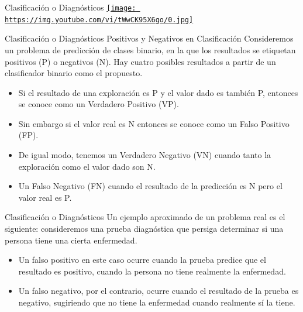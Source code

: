 \documentclass[
  ignorenonframetext,
]{beamer}
\providecommand{\tightlist}{%
  \setlength{\itemsep}{0pt}\setlength{\parskip}{0pt}}
\begin{document}
\begin{frame}{Clasificación o Diagnósticos}
\protect\hypertarget{clasificaciuxf3n-o-diagnuxf3sticos-3}{}
\href{https://www.youtube.com/watch?v=tWwCK95X6go}{\texttt{[image: https://img.youtube.com/vi/tWwCK95X6go/0.jpg]}}
\end{frame}

\begin{frame}{Clasificación o Diagnósticos}
\protect\hypertarget{clasificaciuxf3n-o-diagnuxf3sticos-4}{}
Positivos y Negativos en Clasificación Consideremos un problema de
predicción de clases binario, en la que los resultados se etiquetan
positivos (P) o negativos (N). Hay cuatro posibles resultados a partir
de un clasificador binario como el propuesto.

\begin{itemize}
\tightlist
\item
  Si el resultado de una exploración es P y el valor dado es también P,
  entonces se conoce como un Verdadero Positivo (VP).
\item
  Sin embargo si el valor real es N entonces se conoce como un Falso
  Positivo (FP).
\item
  De igual modo, tenemos un Verdadero Negativo (VN) cuando tanto la
  exploración como el valor dado son N.
\item
  Un Falso Negativo (FN) cuando el resultado de la predicción es N pero
  el valor real es P.
\end{itemize}
\end{frame}

\begin{frame}{Clasificación o Diagnósticos}
\protect\hypertarget{clasificaciuxf3n-o-diagnuxf3sticos-5}{}
Un ejemplo aproximado de un problema real es el siguiente: consideremos
una prueba diagnóstica que persiga determinar si una persona tiene una
cierta enfermedad.

\begin{itemize}
\tightlist
\item
  Un falso positivo en este caso ocurre cuando la prueba predice que el
  resultado es positivo, cuando la persona no tiene realmente la
  enfermedad.
\item
  Un falso negativo, por el contrario, ocurre cuando el resultado de la
  prueba es negativo, sugiriendo que no tiene la enfermedad cuando
  realmente sí la tiene.
\end{itemize}
\end{frame}
\end{document}
